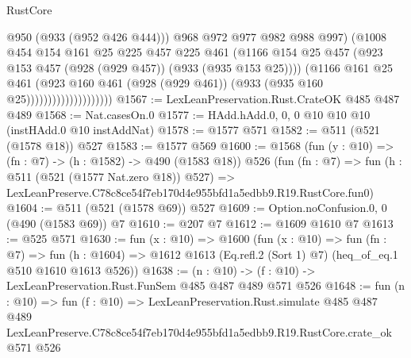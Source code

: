 \begin{lexlean}{RustCore}
\begin{coremodule}
                                      @950
                                      (@933 (@952 @426 @444)))
                                    @968
                                    @972
                                    @977
                                    @982
                                    @988
                                    @997)
                                  (@1008
                                    @454
                                    @154
                                    @161
                                    @25
                                    @225
                                    @457
                                    @225
                                    @461
                                    (@1166
                                      @154
                                      @25
                                      @457
                                      (@923 @153 @457 (@928 (@929 @457)) (@933 (@935 @153 @25))))
                                    (@1166
                                      @161
                                      @25
                                      @461
                                      (@923
                                        @160
                                        @461
                                        (@928 (@929 @461))
                                        (@933 (@935 @160 @25))))))))))))))))))))
@1567 := LexLeanPreservation.Rust.CrateOK @485 @487 @489
@1568 := Nat.casesOn.{0}
@1577 := HAdd.hAdd.{0, 0, 0} @10 @10 @10 (instHAdd.{0} @10 instAddNat)
@1578 := @1577 @571
@1582 := @511 (@521 (@1578 @18)) @527
@1583 := @1577 @569
@1600 := @1568
    (fun (y : @10) => (fn : @7) -> (h : @1582) -> @490 (@1583 @18))
    @526
    (fun (fn : @7) =>
    fun (h : @511 (@521 (@1577 Nat.zero @18)) @527) =>
    LexLeanPreserve.C78c8ce54f7eb170d4e955bfd1a5edbb9.R19.RustCore.fun0)
@1604 := @511 (@521 (@1578 @69)) @527
@1609 := Option.noConfusion.{0, 0} (@490 (@1583 @69)) @7
@1610 := @207 @7
@1612 := @1609 @1610 @7
@1613 := @525 @571
@1630 := fun (x : @10) =>
  @1600
    (fun (x : @10) =>
    fun (fn : @7) =>
    fun (h : @1604) => @1612 @1613 (Eq.refl.{2} (Sort 1) @7) (heq_of_eq.{1} @510 @1610 @1613 @526))
@1638 := (n : @10) -> (f : @10) -> LexLeanPreservation.Rust.FunSem @485 @487 @489 @571 @526
@1648 := fun (n : @10) =>
  fun (f : @10) =>
  LexLeanPreservation.Rust.simulate
    @485
    @487
    @489
    LexLeanPreserve.C78c8ce54f7eb170d4e955bfd1a5edbb9.R19.RustCore.crate_ok
    @571
    @526
\end{coremodule}
\end{lexlean}
